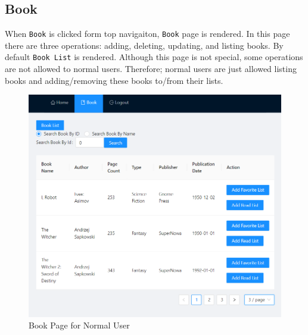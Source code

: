 \subsection{Book}

When \texttt{Book} is clicked form top navigaiton, \texttt{Book} page is rendered. In this page there are three operations: adding, deleting, updating, and listing books. By default \texttt{Book List} is rendered. Although this page is not special, some operations are not allowed to normal users. Therefore; normal users are just allowed listing books and adding/removing these books to/from their lists.

\begin{minipage}{.49\textwidth}
  \begin{figure}[H]
    \centering
    \includegraphics[width=\linewidth]{img/front-end/book-no-admin.png}
    \caption{Book Page for Normal User}
  \end{figure}
\end{minipage}
